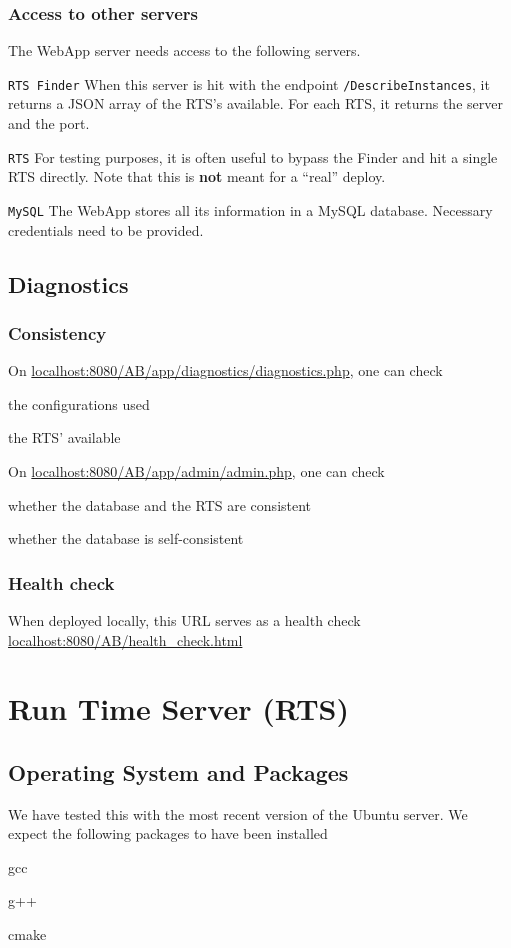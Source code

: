 \documentclass[letterpaper]{article}
\begin{document}
\subsubsection{Access to other servers}

The WebApp server needs access to the following servers. 
\be
\item {\tt RTS Finder} When this server is hit with the endpoint
  {\tt/DescribeInstances}, it returns a JSON array of the RTS's available. For
  each RTS, it returns the server and the port.
\item {\tt RTS} For testing purposes, it is often useful to bypass the Finder
  and hit a single RTS directly. Note that this is {\bf not} meant for a
  ``real'' deploy.
\item {\tt MySQL} The WebApp stores all its information in a MySQL database.
  Necessary credentials need to be provided.
  \ee

\subsection{Diagnostics}

\subsubsection{Consistency}

On \url{localhost:8080/AB/app/diagnostics/diagnostics.php}, one can check
\be
\item the configurations used
\item the RTS' available
  \ee

On \url{localhost:8080/AB/app/admin/admin.php}, one can check
\be
\item whether the database and the RTS are consistent
\item whether the database is self-consistent \TBC
\ee 

\subsubsection{Health check}
When deployed locally, this URL serves as a health check
\url{localhost:8080/AB/health_check.html}

\section{Run Time Server (RTS)}

\subsection{Operating System and Packages}
We have tested this with the most recent version of the Ubuntu server. 
We expect the following packages to have been installed
\be
\item gcc
\item g++
\item cmake
\ee
\end{document}
